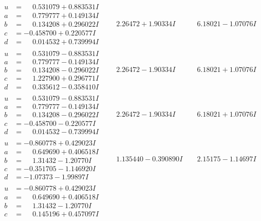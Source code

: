 \documentclass[1p]{elsarticle_modified}
\theoremstyle{definition}
\begin{document}
$$\begin{array}{c|c|c}
\begin{aligned}
u &= \phantom{-}0.531079 + 0.883531 I \\
a &= \phantom{-}0.779777 + 0.149134 I \\
b &= \phantom{-}0.134208 + 0.296022 I \\
c &= -0.458700 + 0.220577 I \\
d &= \phantom{-}0.014532 + 0.739994 I\end{aligned}
 & \phantom{-}2.26472 + 1.90334 I & \phantom{-}6.18021 - 1.07076 I \\ \hline\begin{aligned}
u &= \phantom{-}0.531079 - 0.883531 I \\
a &= \phantom{-}0.779777 - 0.149134 I \\
b &= \phantom{-}0.134208 - 0.296022 I \\
c &= \phantom{-}1.227900 + 0.296771 I \\
d &= \phantom{-}0.335612 - 0.358410 I\end{aligned}
 & \phantom{-}2.26472 - 1.90334 I & \phantom{-}6.18021 + 1.07076 I \\ \hline\begin{aligned}
u &= \phantom{-}0.531079 - 0.883531 I \\
a &= \phantom{-}0.779777 - 0.149134 I \\
b &= \phantom{-}0.134208 - 0.296022 I \\
c &= -0.458700 - 0.220577 I \\
d &= \phantom{-}0.014532 - 0.739994 I\end{aligned}
 & \phantom{-}2.26472 - 1.90334 I & \phantom{-}6.18021 + 1.07076 I \\ \hline\begin{aligned}
u &= -0.860778 + 0.429023 I \\
a &= \phantom{-}0.649690 + 0.406518 I \\
b &= \phantom{-}1.31432 - 1.20770 I \\
c &= -0.351705 - 1.146920 I \\
d &= -1.07373 - 1.99897 I\end{aligned}
 & \phantom{-}1.135440 - 0.390890 I & \phantom{-}2.15175 - 1.14697 I \\ \hline\begin{aligned}
u &= -0.860778 + 0.429023 I \\
a &= \phantom{-}0.649690 + 0.406518 I \\
b &= \phantom{-}1.31432 - 1.20770 I \\
c &= \phantom{-}0.145196 + 0.457097 I \\

\end{aligned}
\end{array}$$
\end{document}
